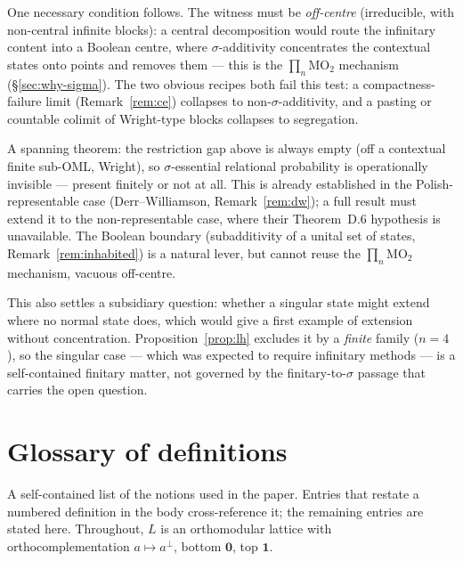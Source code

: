 \documentclass[11pt,reqno]{amsart}
\theoremstyle{plain}
\theoremstyle{definition}
\theoremstyle{remark}
\begin{document}
\begin{description}[style=nextline, font=\normalfont\bfseries,
    labelwidth=2.6cm, leftmargin=3.0cm]
    One necessary condition follows. The witness must be \emph{off-centre} (irreducible,
    with non-central infinite blocks): a central decomposition would route the
    infinitary content into a Boolean centre, where $\sigma$-additivity concentrates the
    contextual states onto points and removes them --- this is the $\prod_n\mathrm{MO}_2$
    mechanism (\S\ref{sec:why-sigma}). The two obvious recipes both fail this test: a
    compactness-failure limit (Remark~\ref{rem:ce}) collapses to non-$\sigma$-additivity,
    and a pasting or countable colimit of Wright-type blocks collapses to segregation.
  \item[Prove no such witness exists]
    A spanning theorem: the restriction gap above is always empty (off a contextual
    finite sub-OML, Wright), so $\sigma$-essential relational probability is
    operationally invisible --- present finitely or not at all. This is already
    established in the Polish-representable case (Derr--Williamson,
    Remark~\ref{rem:dw}); a full result must extend it to the non-representable case,
    where their Theorem~D.6 hypothesis is unavailable. The Boolean boundary
    (subadditivity of a unital set of states, Remark~\ref{rem:inhabited}) is a natural
    lever, but cannot reuse the $\prod_n\mathrm{MO}_2$ mechanism, vacuous off-centre.
\end{description}

\noindent This also settles a subsidiary question: whether a singular state might
extend where no normal state does, which would give a first example of extension
without concentration. Proposition~\ref{prop:lh} excludes it by a \emph{finite} family
($n=4$), so the singular case --- which was expected to require infinitary methods ---
is a self-contained finitary matter, not governed by the finitary-to-$\sigma$ passage
that carries the open question.

\appendix
\section{Glossary of definitions}
\label{app:glossary}

A self-contained list of the notions used in the paper. Entries that restate a
numbered definition in the body cross-reference it; the remaining entries are stated
here. Throughout, $L$ is an orthomodular lattice with orthocomplementation
$a\mapsto a^\perp$, bottom $\mathbf 0$, top $\mathbf 1$.
\end{document}

